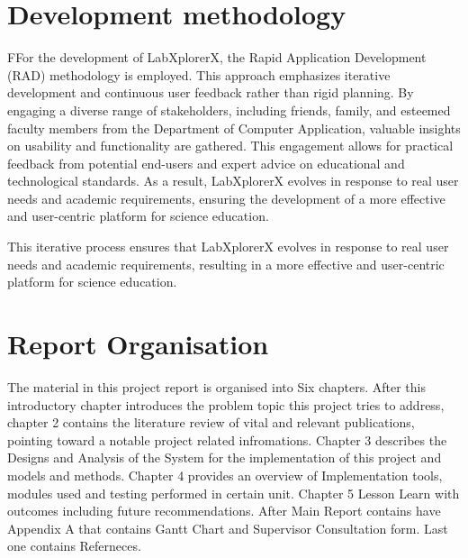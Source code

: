 \section{Development methodology}
FFor the development of LabXplorerX, the Rapid Application Development (RAD) methodology is employed. This approach emphasizes iterative development and continuous user feedback rather than rigid planning. By engaging a diverse range of stakeholders, including friends, family, and esteemed faculty members from the Department of Computer Application, valuable insights on usability and functionality are gathered. This engagement allows for practical feedback from potential end-users and expert advice on educational and technological standards. As a result, LabXplorerX evolves in response to real user needs and academic requirements, ensuring the development of a more effective and user-centric platform for science education.

This iterative process ensures that LabXplorerX evolves in response to real user needs and academic requirements, resulting in a more effective and user-centric platform for science education.
\section{Report Organisation}
The material in this project report is organised into Six chapters. After this introductory chapter introduces the problem topic this project tries to address, chapter 2 contains the literature review of vital and relevant publications, pointing toward a notable project related infromations. Chapter 3 describes the Designs and Analysis of the System for the implementation of this project and models and methods. Chapter 4 provides an overview of Implementation tools, modules used and testing performed in certain unit. Chapter 5 Lesson Learn with outcomes including future recommendations. After Main Report contains have Appendix A that contains Gantt Chart and Supervisor Consultation form. Last one contains Referneces.